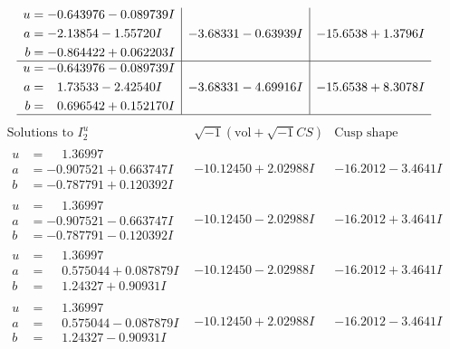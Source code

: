 \documentclass[1p]{elsarticle_modified}
\theoremstyle{definition}
\newcommand{\I}{\sqrt{-1}}
\begin{document}
$$\begin{array}{c|c|c}
\begin{aligned}
u &= -0.643976 - 0.089739 I \\
a &= -2.13854 - 1.55720 I \\
b &= -0.864422 + 0.062203 I\end{aligned}
 & -3.68331 - 0.63939 I & -15.6538 + 1.3796 I \\ \hline\begin{aligned}
u &= -0.643976 - 0.089739 I \\
a &= \phantom{-}1.73533 - 2.42540 I \\
b &= \phantom{-}0.696542 + 0.152170 I\end{aligned}
 & -3.68331 - 4.69916 I & -15.6538 + 8.3078 I\\
 \hline 
 \end{array}$$\newpage$$\begin{array}{c|c|c}  
\text{Solutions to }I^u_{2}& \I (\text{vol} + \sqrt{-1}CS) & \text{Cusp shape}\\
 \hline 
\begin{aligned}
u &= \phantom{-}1.36997\phantom{ +0.000000I} \\
a &= -0.907521 + 0.663747 I \\
b &= -0.787791 + 0.120392 I\end{aligned}
 & -10.12450 + 2.02988 I & -16.2012 - 3.4641 I \\ \hline\begin{aligned}
u &= \phantom{-}1.36997\phantom{ +0.000000I} \\
a &= -0.907521 - 0.663747 I \\
b &= -0.787791 - 0.120392 I\end{aligned}
 & -10.12450 - 2.02988 I & -16.2012 + 3.4641 I \\ \hline\begin{aligned}
u &= \phantom{-}1.36997\phantom{ +0.000000I} \\
a &= \phantom{-}0.575044 + 0.087879 I \\
b &= \phantom{-}1.24327 + 0.90931 I\end{aligned}
 & -10.12450 - 2.02988 I & -16.2012 + 3.4641 I \\ \hline\begin{aligned}
u &= \phantom{-}1.36997\phantom{ +0.000000I} \\
a &= \phantom{-}0.575044 - 0.087879 I \\
b &= \phantom{-}1.24327 - 0.90931 I\end{aligned}
 & -10.12450 + 2.02988 I & -16.2012 - 3.4641 I \\ \hline\begin{aligned}

\end{aligned}
\end{array}$$
\end{document}
